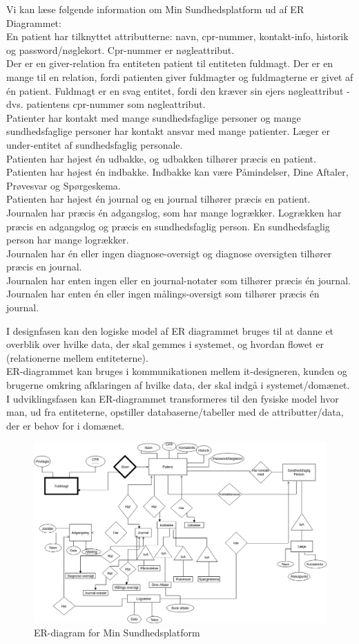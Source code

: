 Vi kan læse følgende information om Min Sundhedsplatform ud af ER Diagrammet:\\
En patient har tilknyttet attributterne: navn, cpr-nummer, kontakt-info, historik og password/nøglekort. Cpr-nummer er nøgleattribut.\\
Der er en giver-relation fra entiteten patient til entiteten fuldmagt. Der er en mange til en relation, fordi patienten giver fuldmagter og fuldmagterne er givet af én patient. Fuldmagt er en svag entitet, fordi den kræver sin ejers nøgleattribut - dvs. patientens cpr-nummer som nøgleattribut. \\
Patienter har kontakt med mange sundhedsfaglige personer og mange  sundhedsfaglige personer har kontakt ansvar med mange patienter. Læger er under-entitet af sundhedsfaglig personale. \\
Patienten har højest én udbakke, og udbakken tilhører præcis en patient.\\
Patienten har højest én indbakke. Indbakke kan være Påmindelser, Dine Aftaler, Prøvesvar og Spørgeskema.\\
Patienten har højest én journal og en journal tilhører præcis en patient. \\
Journalen har præcis én adgangslog, som har mange logrækker. Logrækken har præcis en adgangslog og præcis en sundhedsfaglig person. En sundhedsfaglig person har mange logrækker.\\
Journalen har én eller ingen diagnose-oversigt og diagnose oversigten tilhører præcis en journal.\\
Journalen har enten ingen eller en journal-notater som tilhører præcis én journal.\\
Journalen har enten én eller ingen målings-oversigt som tilhører præcis én journal.

I designfasen kan den logiske model af ER diagrammet bruges til at danne et overblik over hvilke data, der skal gemmes i systemet, og hvordan flowet er (relationerne mellem entiteterne).\\
ER-diagrammet kan bruges i kommunikationen mellem it-designeren, kunden og brugerne omkring afklaringen af hvilke data, der skal indgå i systemet/domænet. \\
I udviklingsfasen kan ER-diagrammet transformeres til den fysiske model hvor man, ud fra entiteterne, opstiller databaserne/tabeller med de attributter/data, der er behov for i domænet.

\begin{figure}[H]
  \centering
  \includegraphics[angle=90, height=0.9\textheight]{Materials/ER-diagram.png}
  \caption{ER-diagram for Min Sundhedsplatform}
  \label{fig:ER}
\end{figure}
